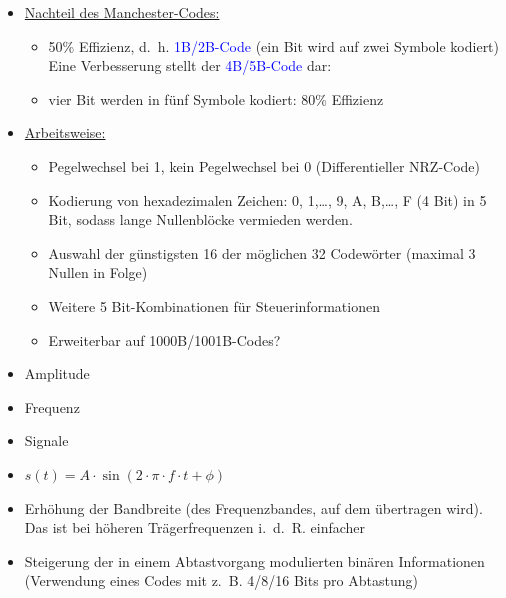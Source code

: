 \begin{itemize}
    \item \underline{Nachteil des Manchester-Codes:}
    \begin{itemize}
        \item 50\% Effizienz, d.\ h. \textcolor{blue}{1B/2B-Code} (ein Bit wird auf zwei Symbole kodiert)
        Eine Verbesserung stellt der \textcolor{blue}{4B/5B-Code} dar:
        \item vier Bit werden in fünf Symbole kodiert: 80\% Effizienz
    \end{itemize}
    \item \underline{Arbeitsweise:}
    \begin{itemize}
        \item Pegelwechsel bei 1, kein Pegelwechsel bei 0 (Differentieller NRZ-Code)
        \item Kodierung von hexadezimalen Zeichen: 0, 1,\ldots, 9, A, B,\ldots, F (4 Bit)
        in 5 Bit, sodass lange Nullenblöcke vermieden werden.
        \item Auswahl der günstigsten 16 der möglichen 32 Codewörter
        (maximal 3 Nullen in Folge)
        \item Weitere 5 Bit-Kombinationen für Steuerinformationen
        \item Erweiterbar auf 1000B/1001B-Codes?
    \end{itemize}
\end{itemize}

\begin{itemize}
    \item Amplitude
    \item Frequenz
    \item Signale
    \item $s(t) = A \cdot \sin(2 \cdot \pi \cdot f \cdot t + \phi)$
\end{itemize}

\begin{itemize}
    \item Erhöhung der Bandbreite (des Frequenzbandes, auf dem übertragen wird).
    Das ist bei höheren Trägerfrequenzen i.\ d.\ R. einfacher
    \item Steigerung der in einem Abtastvorgang modulierten binären Informationen (Verwendung eines Codes mit z.\ B. 4/8/16 Bits pro Abtastung)
\end{itemize}

